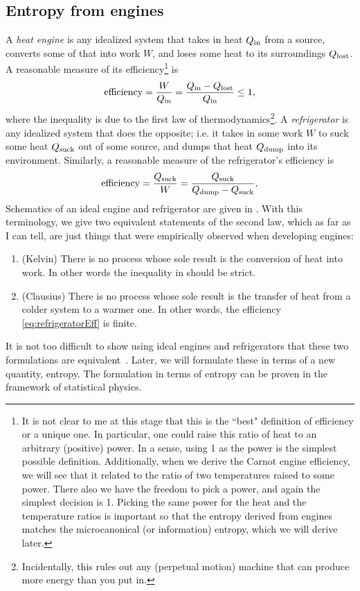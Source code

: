 \subsection{Entropy from engines}

A {\it heat engine} is any idealized system that takes in
heat $Q_{\text{in}}$ from a source, converts some of that into work $W$, and loses some heat to its
surroundings $Q_{\text{lost}}$. A reasonable measure of its efficiency\footnote{It is not
clear to me at this stage that this is the ``best" definition of efficiency or a
unique one. In particular, one could raise this ratio of heat to an arbitrary
(positive) power. In a sense, using 1 as the power is the simplest possible definition. 
Additionally, when we derive
the Carnot engine efficiency, we will see that it related to the ratio
of two temperatures raised to some power. There also we have the freedom to
pick a power, and again the simplest decision is 1. Picking the same power for
the heat and the temperature ratios is important so that the entropy derived from
engines matches the microcanonical (or information) entropy, which we will derive
later.} is
\begin{equation}\label{eq:engineEff}
  \text{efficiency}=\frac{W}{Q_{\text{in}}}=\frac{Q_{\text{in}}-Q_{\text{lost}}}{Q_{\text{in}}}\leq1,
\end{equation}
where the inequality is due to the first law of
thermodynamics\footnote{Incidentally, this rules out any (perpetual motion)
machine that can produce more energy than you put in.}.
A {\it refrigerator} is any idealized system that does the
opposite; i.e. it takes in some work $W$ to suck some heat $Q_{\text{suck}}$ out of
some source, and dumps that heat $Q_{\text{dump}}$ into its environment.
Similarly, a reasonable measure of the refrigerator's efficiency is
\begin{equation}\label{eq:refrigeratorEff}
  \text{efficiency}=\frac{Q_{\text{suck}}}{W}=\frac{Q_{\text{suck}}}{Q_{\text{dump}}-Q_{\text{suck}}},
\end{equation}
Schematics of an ideal engine and refrigerator are given in
.
With this terminology, we give two equivalent statements of the second law,
which as far as I can tell, are just things that were empirically observed
when developing engines:
\begin{enumerate}
  \item (Kelvin) There is no process whose sole result is the conversion of heat
        into work. In other words the inequality in 
        should be strict.
  \item (Clausius) There is no process whose sole result is the transfer of
        heat from a colder system to a warmer one. In other words, the
        efficiency \eqref{eq:refrigeratorEff} is finite.
\end{enumerate}
It is not too difficult to show using ideal engines and refrigerators
that these two formulations are equivalent~\cite{kardar_statistical_2007}.
Later, we will formulate these in terms of a new quantity, entropy. The
formulation in terms of entropy can be proven in the framework of statistical
physics.

